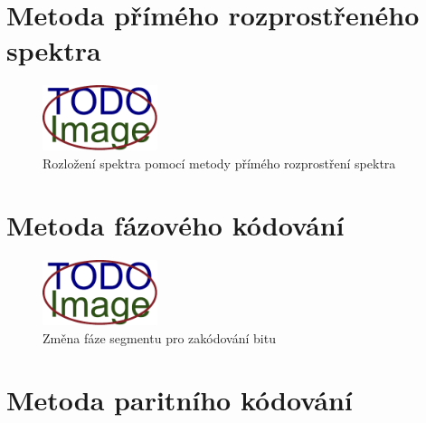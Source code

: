 \blindtext

\section{Metoda přímého rozprostřeného spektra}
\label{sec:dsss}


\blindtext

\begin{figure}[hbt]
    \centering
    \includegraphics[width=0.3\textwidth]{obrazky/placeholder.pdf}
    \caption{Rozložení spektra pomocí metody přímého rozprostření spektra}
    \label{pic:dsss-spreading}
\end{figure}

\blindtext

\section{Metoda fázového kódování}
\label{sec:phase-coding}


\blindtext

\begin{figure}[hbt]
    \centering
    \includegraphics[width=0.3\textwidth]{obrazky/placeholder.pdf}
    \caption{Změna fáze segmentu pro zakódování bitu}
    \label{pic:phase-coding-phase-change}
\end{figure}

\blindtext

\section{Metoda paritního kódování}
\label{sec:parity-coding}


\blindtext

\blindtext

\blindtext

